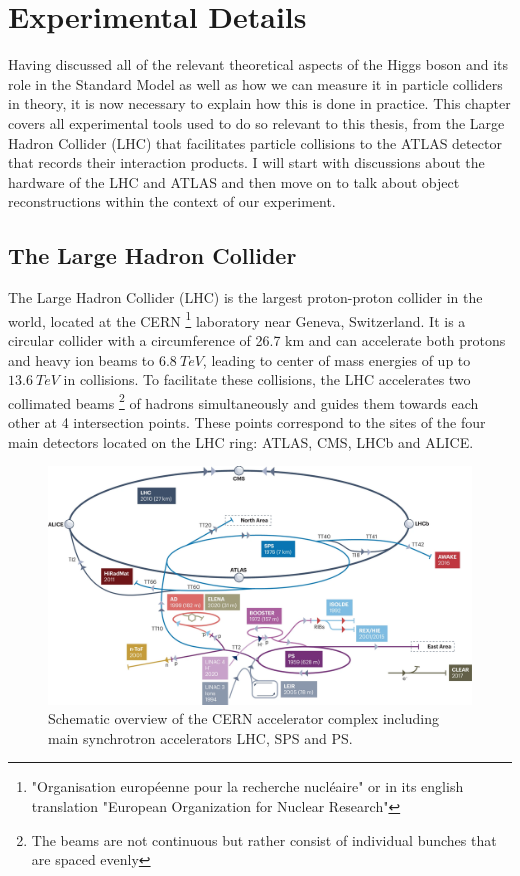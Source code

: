 \chapter{Experimental Details}

Having discussed all of the relevant theoretical aspects of the Higgs boson and its role in the Standard Model as 
well as how we can measure it in particle colliders in theory, it is now necessary to explain how this is done in 
practice. This chapter covers all experimental tools used to do so relevant to this thesis, from the Large Hadron 
Collider (LHC) that facilitates particle collisions to the ATLAS detector that records their interaction products. 
I will start with discussions about the hardware of the LHC and ATLAS and then move on to talk about object 
reconstructions within the context of our experiment.

\section{The Large Hadron Collider}

The Large Hadron Collider (LHC) is the largest proton-proton collider in the world, located at the CERN
\footnote{"Organisation européenne pour la recherche nucléaire" or in its english translation "European 
Organization for Nuclear Research"} laboratory near Geneva, Switzerland. It is a circular collider with a circumference 
of 26.7 km and can accelerate both protons and heavy ion beams to $6.8\ TeV$, leading to center of mass energies of up 
to $13.6\ TeV$ in collisions. To facilitate these collisions, the LHC accelerates two collimated beams \footnote{The 
beams are not continuous but rather consist of individual bunches that are spaced evenly} of hadrons simultaneously and 
guides them towards each other at 4 intersection points. These points correspond to the sites of the four main detectors 
located on the LHC ring: ATLAS, CMS, LHCb and ALICE. \par

\begin{figure}
\centering
    \includegraphics[width=1.0\textwidth]{images/CERN_Complex.png}
    \caption{Schematic overview of the CERN accelerator complex including main synchrotron accelerators LHC, SPS 
    and PS.}
    \label{fig:CERN_Complex}
\end{figure}

